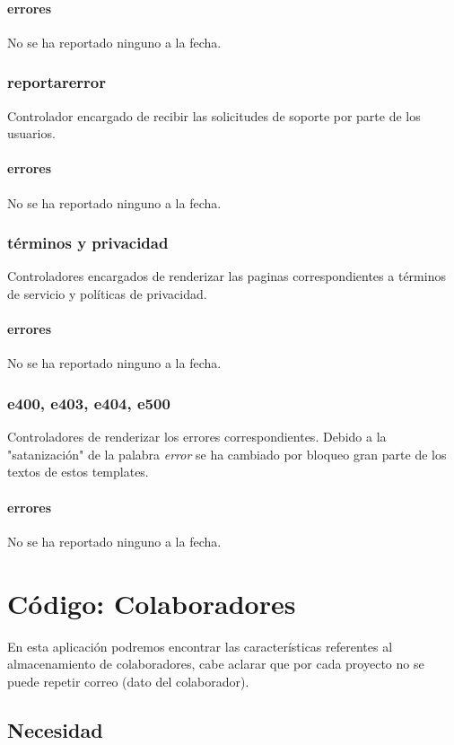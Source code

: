 \documentclass[10pt,a4paper]{book}
\begin{document}
	\subsubsection{errores}
	No se ha reportado ninguno a la fecha.

	\subsection{reportarerror}
	Controlador encargado de recibir las solicitudes de soporte por parte de los usuarios.
	\subsubsection{errores}
	No se ha reportado ninguno a la fecha.

	\subsection{términos y privacidad}
	Controladores encargados de renderizar las paginas correspondientes a términos de servicio y políticas de privacidad.
	\subsubsection{errores}
	No se ha reportado ninguno a la fecha.

	\subsection{e400, e403, e404, e500}
	Controladores de renderizar los errores correspondientes. Debido a la "satanización" de la palabra \textit{error} se ha cambiado por bloqueo gran parte de los textos de estos templates.
	\subsubsection{errores}
	No se ha reportado ninguno a la fecha.
	

	\chapter{Código: Colaboradores}
	
	En esta aplicación podremos encontrar las características referentes al almacenamiento de colaboradores, cabe aclarar que por cada proyecto no se puede repetir correo (dato del colaborador).
	
	\section{Necesidad}
	
\end{document}
